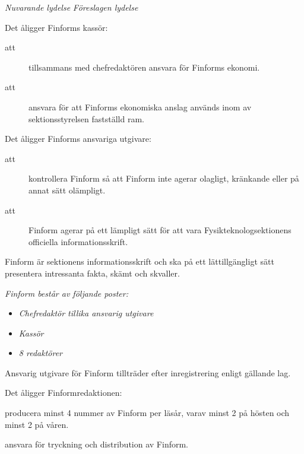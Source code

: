 \documentclass{article}
\newenvironment{lydelse}
    {\begin{paracol}{2}%
        \emph{Nuvarande lydelse}%
        \switchcolumn%
        \emph{Föreslagen lydelse}%
    \end{paracol}%
    \begin{enumerate}[label=\thesubsection.\arabic*]%
    \begin{paracol}{2}%
    }{\end{paracol}\end{enumerate}}
\begin{document}
\begin{lydelse}
	\item Det åligger Finforms kassör:
	\begin{description}
		\item[att] tillsammans med chefredaktören ansvara för Finforms ekonomi.
		\item[att] ansvara för att Finforms ekonomiska anslag används inom av sektionsstyrelsen fastställd ram.
	\end{description}

    \item Det åligger Finforms ansvariga utgivare:
	\begin{description}
		\item[att] kontrollera Finform så att Finform inte agerar olagligt, kränkande eller på annat sätt olämpligt.
		\item[att] Finform agerar på ett lämpligt sätt för att vara Fysikteknologsektionens officiella informationsskrift.
	\end{description}

    \setcounter{section}{6}
    \setcounter{subsection}{7}
    \switchcolumn
    
    \item Finform är sektionens informationsskrift och ska på ett lättillgängligt sätt presentera intressanta fakta, skämt och skvaller. 
    
    \item \emph{Finform består av följande poster:}
    \label{R:FinformPoster}
    \begin{itemize}
        \item \emph{Chefredaktör tillika ansvarig utgivare}
    	\item \emph{Kassör}
    	\item \emph{8 redaktörer}
    \end{itemize}
    
    \item Ansvarig utgivare för Finform tillträder efter inregistrering enligt gällande lag.
    
    \item Det åligger Finformredaktionen:
    \begin{aligganden}
        \vspace{-0.4em}
        \item producera minst 4 nummer av Finform per läsår, varav minst 2 på hösten och minst 2 på våren.\vspace{0.2em}
        \item ansvara för tryckning och distribution av Finform.
    \end{aligganden}
    

\end{lydelse}
\end{document}
